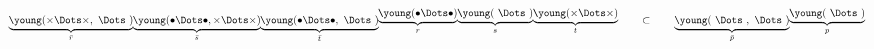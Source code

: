 \begin{equation}
\underbrace{\young(\times\Dots\times,\  \Dots \ )}_{\bar r}\kern -2.3pt
\underbrace{\young(\bullet\Dots\bullet,\times\Dots\times)}_{\bar s}\kern -2.5pt
\underbrace{\young(\bullet\Dots\bullet,\ \Dots\ )}_{\bar t}\kern -2.5pt
\raise 6.7pt \hbox{$\underbrace{\young(\bullet \Dots \bullet )}_{r}\kern -2pt
\underbrace{\young(\  \Dots \  )}_{s}\kern -2pt
\underbrace{\young(\times \Dots \times )}_{t}$}
\qquad\subset\qquad
\underbrace{\young(\ \Dots \ ,\ \Dots \ )}_{\bar p}\kern -2.2pt
\raise 6.7pt\hbox{$\underbrace{\young(\ \Dots \ )}_{p}$}
\end{equation}

